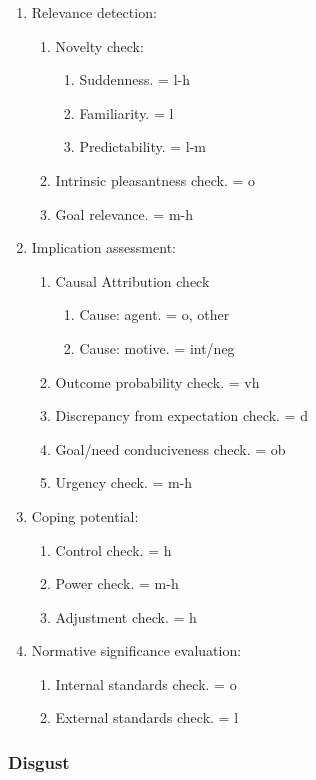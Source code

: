 \begin{enumerate}
 \item  Relevance detection:
 \begin{enumerate}
  \item  Novelty check:
  \begin{enumerate}
   \item  Suddenness. = l-h
   \item  Familiarity. = l
   \item  Predictability. = l-m
  \end{enumerate}
  \item  Intrinsic pleasantness check. = o
  \item  Goal relevance. = m-h
 \end{enumerate}
 \item  Implication assessment:
 \begin{enumerate}
  \item  Causal Attribution check
  \begin{enumerate}
   \item  Cause: agent. = o, other
   \item  Cause: motive. = int/neg
  \end{enumerate}
  \item  Outcome probability check. = vh
  \item  Discrepancy from expectation check. = d
  \item  Goal/need conduciveness check. = ob
  \item  Urgency check. = m-h
 \end{enumerate}
 \item  Coping potential:
 \begin{enumerate}
  \item  Control check. = h
  \item  Power check. = m-h
  \item  Adjustment check. = h
 \end{enumerate}
 \item  Normative significance evaluation:
 \begin{enumerate}
  \item  Internal standards check. = o
  \item  External standards check. = l
 \end{enumerate}
\end{enumerate}

\subsubsection{Disgust}

